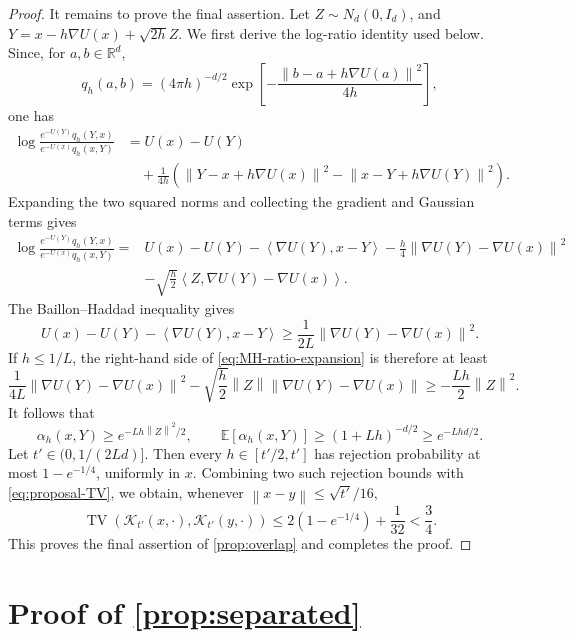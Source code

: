 \documentclass[11pt]{article}
\newcommand{\E}{\mathbb E}
\newcommand{\TV}{\operatorname{TV}}
\newcommand{\cK}{\mathcal K}
\newcommand{\ip}[2]{\left\langle #1,#2\right\rangle}
\newcommand{\norm}[1]{\left\lVert #1\right\rVert}
\newcommand{\1}{\mathbf 1}
\begin{document}
\begin{proof}
		It remains to prove the final assertion.
		Let $Z \sim N_d(0, I_d)$, and \(Y=x-h \nabla U(x) +\sqrt{2h}Z\).  We first derive the log-ratio identity used below.
		Since, for $a, b \in \mathbb{R}^d$,
		\[
		q_h(a,b)=(4\pi h)^{-d/2}
		\exp\left[-\frac{\norm{b-a+h\nabla U(a)}^2}{4h}\right],
		\]
		one has
		\begin{align*}
			\log\frac{e^{-U(Y)}q_h(Y,x)}{e^{-U(x)}q_h(x,Y)}
			& =U(x)-U(Y)\\
			&\quad+\frac1{4h}
			\left(\norm{Y-x+h \nabla U(x)}^2-\norm{x-Y+h \nabla U(Y)}^2\right).
		\end{align*}
		Expanding the two squared norms and collecting
		the gradient and Gaussian terms gives
		\begin{equation}\label{eq:MH-ratio-expansion}
			\begin{aligned}
				\log\frac{e^{-U(Y)}q_h(Y,x)}{e^{-U(x)}q_h(x,Y)}
				={}&U(x)-U(Y)-\ip{\nabla U(Y)}{x-Y}
				-\frac h4\norm{\nabla U(Y)-\nabla U(x)}^2\\
				&-\sqrt{\frac h2}\ip{Z}{\nabla U(Y)-\nabla U(x)}.
			\end{aligned}
		\end{equation}
		The Baillon--Haddad inequality
		\citep[Theorem~2.1.5]{Nesterov2004} gives
		\[
		U(x)-U(Y)-\ip{\nabla U(Y)}{x-Y}
		\geq
		\frac1{2L}\norm{\nabla U(Y)-\nabla U(x)}^2.
		\]
		If \(h\leq1/L\), the right-hand side of
		\eqref{eq:MH-ratio-expansion} is therefore at least
		\[
		\frac1{4L}\norm{\nabla U(Y)-\nabla U(x)}^2
		-\sqrt{\frac h2}\norm{Z}\norm{\nabla U(Y)-\nabla U(x)}
		\geq
		-\frac{Lh}{2}\norm{Z}^2.
		\]
		It follows that
		\[
		\alpha_h(x,Y)\geq e^{-Lh\norm{Z}^2/2},
		\qquad
		\E[\alpha_h(x,Y)]
		\geq(1+Lh)^{-d/2}
		\geq e^{-Lhd/2}.
		\]
		Let \(t'\in(0,1/(2Ld)]\).
		Then every \(h\in[t'/2,t']\) has rejection probability
		at most \(1-e^{-1/4}\), uniformly in \(x\).  Combining two such rejection
		bounds with \eqref{eq:proposal-TV}, we obtain, whenever
		$\norm{x-y}\leq\sqrt{t'}/16$,
		\[
		\TV(\cK_{t'}(x,\cdot),\cK_{t'}(y,\cdot))
		\leq
		2(1-e^{-1/4})+\frac1{32}<\frac34.
		\]
		This proves the final assertion of \cref{prop:overlap} and completes the proof.
	\end{proof}
	
	\section{Proof of \cref{prop:separated}}\label{app:gaussian}
	
\end{document}
